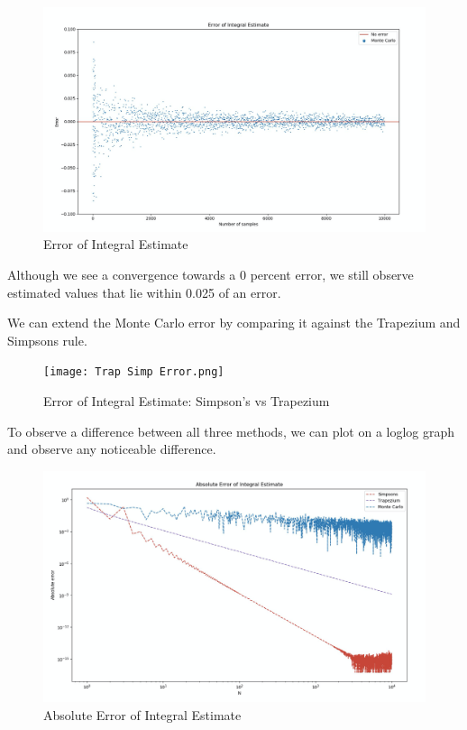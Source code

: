 \documentclass[12pt]{article}
\begin{document}
\begin{figure}[h!]
  \includegraphics[scale=0.38, center]{Integral_Errors.png}
  \caption{Error of Integral Estimate}
  \label{fig:mc_randomness}
\end{figure}

Although we see a convergence towards a 0 percent error, we still observe estimated values that lie within 0.025 of an error. 

We can extend the Monte Carlo error by comparing it against the Trapezium and Simpsons rule. 

\begin{figure}[h!]
  \texttt{[image: Trap Simp Error.png]}
  \caption{Error of Integral Estimate: Simpson's vs Trapezium}
  \label{fig:mc_randomness}
\end{figure}

To observe a difference between all three methods, we can plot on a loglog graph and observe any noticeable difference. 

\begin{figure}[h!]
  \includegraphics[scale=0.38, center]{loglog_errors.png}
  \caption{Absolute Error of Integral Estimate}
  \label{fig:mc_randomness}
\end{figure}
\end{document}
